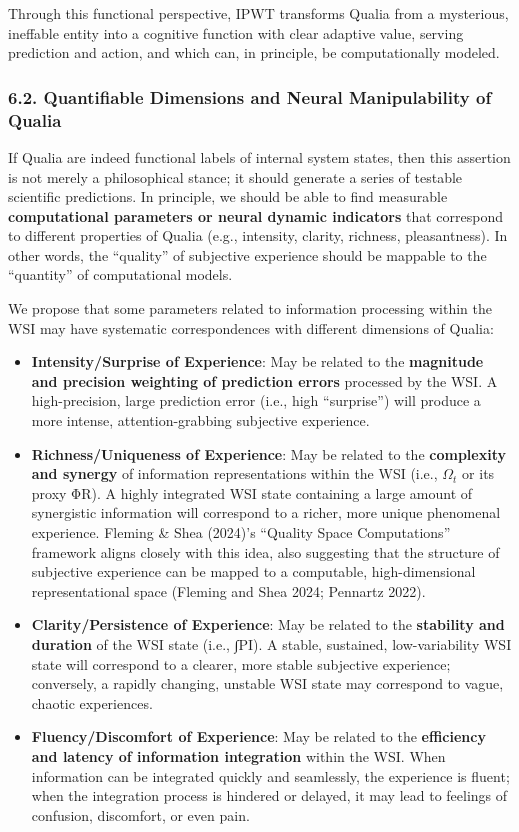 \documentclass[
  a4paper]{article}
\providecommand{\tightlist}{%
  \setlength{\itemsep}{0pt}\setlength{\parskip}{0pt}}
\begin{document}
Through this functional perspective, IPWT transforms Qualia from a
mysterious, ineffable entity into a cognitive function with clear
adaptive value, serving prediction and action, and which can, in
principle, be computationally modeled.

\subsubsection{6.2. Quantifiable Dimensions and Neural Manipulability of
Qualia}\label{quantifiable-dimensions-and-neural-manipulability-of-qualia}

If Qualia are indeed functional labels of internal system states, then
this assertion is not merely a philosophical stance; it should generate
a series of testable scientific predictions. In principle, we should be
able to find measurable \textbf{computational parameters or neural
dynamic indicators} that correspond to different properties of Qualia
(e.g., intensity, clarity, richness, pleasantness). In other words, the
``quality'' of subjective experience should be mappable to the
``quantity'' of computational models.

We propose that some parameters related to information processing within
the WSI may have systematic correspondences with different dimensions of
Qualia:

\begin{itemize}
\tightlist
\item
  \textbf{Intensity/Surprise of Experience}: May be related to the
  \textbf{magnitude and precision weighting of prediction errors}
  processed by the WSI. A high-precision, large prediction error (i.e.,
  high ``surprise'') will produce a more intense, attention-grabbing
  subjective experience.
\item
  \textbf{Richness/Uniqueness of Experience}: May be related to the
  \textbf{complexity and synergy} of information representations within
  the WSI (i.e., \(\Omega_t\) or its proxy ΦR). A highly integrated WSI
  state containing a large amount of synergistic information will
  correspond to a richer, more unique phenomenal experience. Fleming \&
  Shea (2024)'s ``Quality Space Computations'' framework aligns closely
  with this idea, also suggesting that the structure of subjective
  experience can be mapped to a computable, high-dimensional
  representational space (Fleming and Shea 2024; Pennartz 2022).
\item
  \textbf{Clarity/Persistence of Experience}: May be related to the
  \textbf{stability and duration} of the WSI state (i.e., ∫PI). A
  stable, sustained, low-variability WSI state will correspond to a
  clearer, more stable subjective experience; conversely, a rapidly
  changing, unstable WSI state may correspond to vague, chaotic
  experiences.
\item
  \textbf{Fluency/Discomfort of Experience}: May be related to the
  \textbf{efficiency and latency of information integration} within the
  WSI. When information can be integrated quickly and seamlessly, the
  experience is fluent; when the integration process is hindered or
  delayed, it may lead to feelings of confusion, discomfort, or even
  pain.
\end{itemize}
\end{document}
